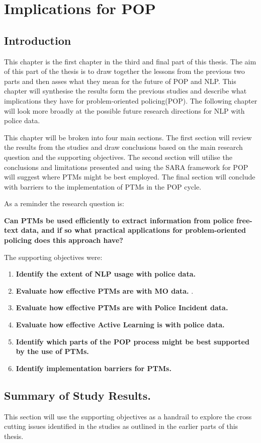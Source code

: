 \chapter{Implications for POP}


\section{Introduction} This chapter is the first chapter in the third and final part of this thesis. The aim of this part of the thesis is to draw together the lessons from the previous two parts and then asses what they mean for the future of POP and NLP.  This chapter will synthesise the results form the previous studies and describe what implications they have for problem-oriented policing(POP). The following chapter will look more broadly at the possible future research directions for NLP with police data.

This chapter will be broken into four main sections. The first section will review the results from the studies and draw conclusions based on the main research question and the supporting objectives. The second section will utilise the conclusions and limitations presented and using the SARA framework for POP will suggest where PTMs might be best employed. The final section will conclude with barriers to the implementation of PTMs in the POP cycle.

As a reminder the research question is:

\textbf{Can PTMs be used efficiently to extract information from police free-text data, and if so what practical applications for problem-oriented policing does this approach have?}

The supporting objectives were:
\begin{enumerate}
\item {\bf Identify the extent of NLP usage with police data.} 
\item {\bf Evaluate how effective PTMs are with MO data.} .
\item {\bf Evaluate how effective PTMs are with Police Incident data.} 
\item {\bf Evaluate how effective Active Learning is with police data.}  
\item {\bf Identify which parts of the POP process might be best supported by the use of PTMs.} 
\item {\bf Identify implementation barriers for PTMs.} 
\end{enumerate}

\section{Summary of Study Results.} This section will use the supporting objectives as a handrail to explore the cross cutting issues identified in the studies as outlined in the earlier parts of this thesis.

